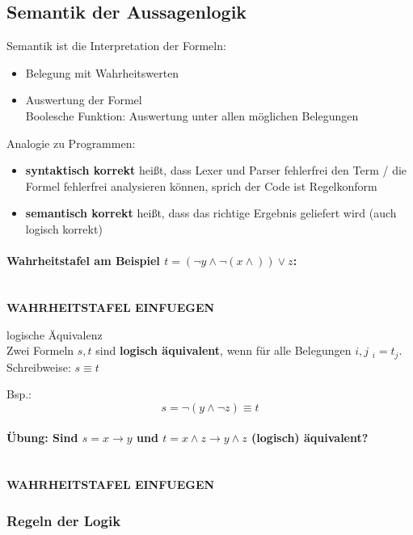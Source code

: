 \subsection{Semantik der Aussagenlogik}
%
Semantik ist die Interpretation der Formeln:
\begin{itemize}
\item Belegung mit Wahrheitswerten
\item Auswertung der Formel\\
Boolesche Funktion: Auswertung unter allen möglichen Belegungen
\end{itemize}
Analogie zu Programmen:
\begin{itemize}
\item \textbf{syntaktisch korrekt} heißt, dass Lexer und Parser fehlerfrei den Term / die Formel fehlerfrei analysieren können, sprich der Code ist Regelkonform
\item \textbf{semantisch korrekt} heißt, dass das richtige Ergebnis geliefert wird (auch logisch korrekt)
\end{itemize}
%
\paragraph{Wahrheitstafel am Beispiel $t = (\neg y \land \neg(x \land) ) \lor z$:}
\ \\ \textbf{WAHRHEITSTAFEL EINFUEGEN}
%
\begin{defi}{logische Äquivalenz}
\\Zwei Formeln $s,t$ sind \textbf{logisch äquivalent}, wenn für alle Belegungen $i,j$ $_i = t_j$.\\
Schreibweise: $s \equiv t$

Bsp.:
\[ s = \neg( y \land \neg z ) \equiv t \]
\end{defi}
%
\paragraph{Übung: Sind $s = x \rightarrow y$ und $t = x \land z \rightarrow y \land z$ (logisch) äquivalent?}
\ \\ \textbf{WAHRHEITSTAFEL EINFUEGEN}
%
\subsubsection{Regeln der Logik}
